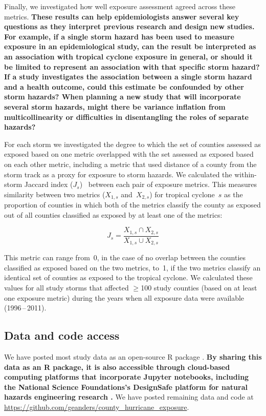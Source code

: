 Finally, we investigated how well exposure assessment agreed across these
metrics. \textbf{These results can help epidemiologists answer several key
questions as they interpret previous research and design new studies. For
example, if a single storm hazard has been used to measure exposure in an
epidemiological study, can the result be interpreted as an association with
tropical cyclone exposure in general, or should it be limited to represent an
association with that specific storm hazard? If a study investigates the
association between a single storm hazard and a health outcome, could this
estimate be confounded by other storm hazards? When planning a new study that
will incorporate several storm hazards, might there be variance inflation from
multicollinearity or difficulties in disentangling the roles of separate
hazards?}

For each storm we investigated the degree to which the set of counties assessed
as exposed based on one metric overlapped with the set assessed as exposed
based on each other metric, including a metric that used distance of a county
from the storm track as a proxy for exposure to storm hazards.  We calculated
the within-storm Jaccard index ($J_s$)~\parencite{jaccard1901distribution,
jaccard1908nouvelles} between each pair of exposure metrics. This measures
similarity between two metrics ($X_{1,s}$ and~$X_{2,s}$) for tropical
cyclone~$s$ as the proportion of counties in which both of the metrics classify
the county as exposed out of all counties classified as exposed by at least one
of the metrics:

\begin{equation} 
J_s = \frac{X_{1,s} \cap X_{2,s}}{X_{1,s} \cup X_{2,s}}
\end{equation}

\noindent This metric can range from~0, in the case of no overlap between the
counties classified as exposed based on the two metrics, to~1, if
the two metrics classify an identical set of counties as exposed to the
tropical cyclone. We calculated these values for all study storms that affected
$\ge$100 study counties (based on at least one exposure metric) during the
years when all exposure data were available (1996\,--\,2011).

\subsection*{Data and code access}

We have posted most study data as an open-source R package
\parencite{hurricaneexposuredata}. \textbf{By sharing this data as an R package, it
is also accessible through cloud-based computing platforms that
incorporate Jupyter notebooks, including the National Science Foundations's
DesignSafe platform for natural hazards engineering research
\parencite{rathje2017designsafe}.} We have posted remaining data and code at
\url{https://github.com/geanders/county_hurricane_exposure}.
